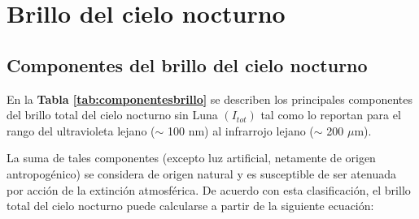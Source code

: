 \section{Brillo del cielo nocturno}

\subsection{Componentes del brillo del cielo nocturno}

En la \textbf{Tabla \ref{tab:componentesbrillo}} se describen los principales componentes del brillo total del cielo nocturno sin Luna $(I_{tot})$ tal como \cite{Leinert1998} lo reportan para el rango del ultravioleta lejano ($\sim$ 100 nm) al infrarrojo lejano ($\sim$ 200 $\mu$m).

\begin{table}[htb]
\centering
\caption{Componentes del brillo del cielo nocturno \citep{Leinert1998}}
\label{tab:componentesbrillo}
\end{table}

La suma de tales componentes (excepto luz artificial, netamente de origen antropogénico) se considera de origen natural y es susceptible de ser atenuada por acción de la extinción atmosférica. De acuerdo con esta clasificación, el brillo total del cielo nocturno puede calcularse a partir de la siguiente ecuación:


